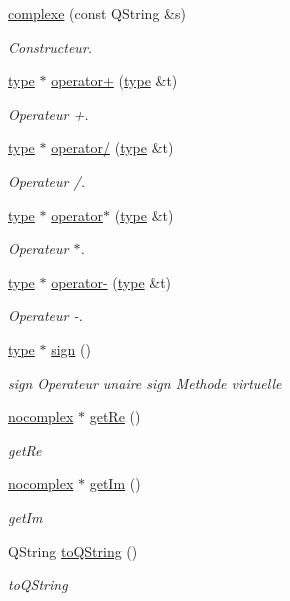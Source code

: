 \begin{DoxyCompactItemize}
\item 
\hyperlink{classcomplexe_ac69dfe1d10fc970cab943111831c5e59}{complexe} (const Q\-String \&s)
\begin{DoxyCompactList}\small\item\em Constructeur. \end{DoxyCompactList}\item 
\hyperlink{classtype}{type} $\ast$ \hyperlink{classcomplexe_a9f98da0548d8b73f1f10f248061d196b}{operator+} (\hyperlink{classtype}{type} \&t)
\begin{DoxyCompactList}\small\item\em Operateur +. \end{DoxyCompactList}\item 
\hyperlink{classtype}{type} $\ast$ \hyperlink{classcomplexe_af2faf54f25b3e58699ecf1d0b6409603}{operator/} (\hyperlink{classtype}{type} \&t)
\begin{DoxyCompactList}\small\item\em Operateur /. \end{DoxyCompactList}\item 
\hyperlink{classtype}{type} $\ast$ \hyperlink{classcomplexe_a02371b6578996af8af11f260931259b4}{operator$\ast$} (\hyperlink{classtype}{type} \&t)
\begin{DoxyCompactList}\small\item\em Operateur $\ast$. \end{DoxyCompactList}\item 
\hyperlink{classtype}{type} $\ast$ \hyperlink{classcomplexe_ae74ae6a7236ccbdaf74e88e5464ffb43}{operator-\/} (\hyperlink{classtype}{type} \&t)
\begin{DoxyCompactList}\small\item\em Operateur -\/. \end{DoxyCompactList}\item 
\hyperlink{classtype}{type} $\ast$ \hyperlink{classcomplexe_a9e7f59cfa1dd74f77891d7bfd1c1c62b}{sign} ()
\begin{DoxyCompactList}\small\item\em sign Operateur unaire sign Methode virtuelle \end{DoxyCompactList}\item 
\hyperlink{classnocomplex}{nocomplex} $\ast$ \hyperlink{classcomplexe_aed1ac631e9354b052b89913a8bc18b1d}{get\-Re} ()
\begin{DoxyCompactList}\small\item\em get\-Re \end{DoxyCompactList}\item 
\hyperlink{classnocomplex}{nocomplex} $\ast$ \hyperlink{classcomplexe_a3a2b9bf78d9e6cdbf2c533c2392fef4c}{get\-Im} ()
\begin{DoxyCompactList}\small\item\em get\-Im \end{DoxyCompactList}\item 
Q\-String \hyperlink{classcomplexe_a5fc10d08facdcbd833d91d0c765c9c18}{to\-Q\-String} ()
\begin{DoxyCompactList}\small\item\em to\-Q\-String \end{DoxyCompactList}\end{DoxyCompactItemize}
